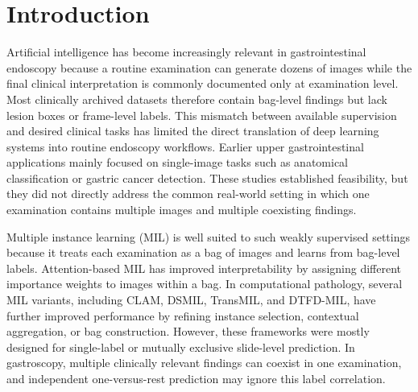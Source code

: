\documentclass[Afour,sagev,times]{sagej}
\begin{document}
\begin{abstract}
\textbf{CONCLUSIONS:} A report-guided label graph MIL framework can effectively exploit multi-image gastroscopy examinations and naturally accommodates coexisting findings. The current evidence supports internal feasibility for examination-level triage and report-image consistency checking. External validation, patient-level split evaluation, and pathology-confirmed labels are still required before clinical deployment.
\end{abstract}


\maketitle

\section{Introduction}
Artificial intelligence has become increasingly relevant in gastrointestinal endoscopy because a routine examination can generate dozens of images while the final clinical interpretation is commonly documented only at examination level.\cite{R1} Most clinically archived datasets therefore contain bag-level findings but lack lesion boxes or frame-level labels. This mismatch between available supervision and desired clinical tasks has limited the direct translation of deep learning systems into routine endoscopy workflows. Earlier upper gastrointestinal applications mainly focused on single-image tasks such as anatomical classification or gastric cancer detection.\cite{R2,R3} These studies established feasibility, but they did not directly address the common real-world setting in which one examination contains multiple images and multiple coexisting findings.

Multiple instance learning (MIL) is well suited to such weakly supervised settings because it treats each examination as a bag of images and learns from bag-level labels.\cite{R4} Attention-based MIL has improved interpretability by assigning different importance weights to images within a bag.\cite{R4} In computational pathology, several MIL variants, including CLAM, DSMIL, TransMIL, and DTFD-MIL, have further improved performance by refining instance selection, contextual aggregation, or bag construction.\cite{R5,R6,R7,R8} However, these frameworks were mostly designed for single-label or mutually exclusive slide-level prediction. In gastroscopy, multiple clinically relevant findings can coexist in one examination, and independent one-versus-rest prediction may ignore this label correlation.
\end{document}
